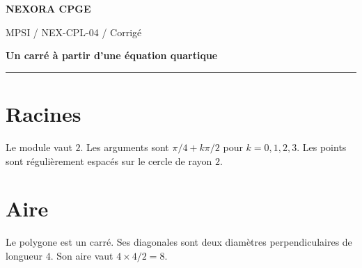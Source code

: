 \documentclass[11pt,a4paper]{article}
\begin{document}
{\small\bfseries\color{nexorablue} NEXORA CPGE}\par
{\small MPSI / NEX-CPL-04 / Corrigé}\par
{\LARGE\bfseries Un carré à partir d’une équation quartique}\par
\vspace{0.25em}\hrule\vspace{0.6em}

\section*{Racines}
Le module vaut $2$. Les arguments sont $\pi/4+k\pi/2$ pour $k=0,1,2,3$. Les points sont régulièrement espacés sur le cercle de rayon $2$.

\section*{Aire}
Le polygone est un carré. Ses diagonales sont deux diamètres perpendiculaires de longueur $4$. Son aire vaut $4\times4/2=8$.
\end{document}
